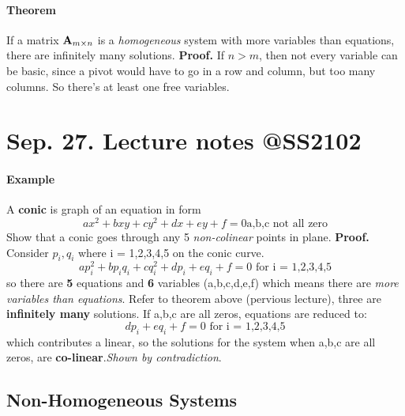 \documentclass{article}
\begin{document}
	\paragraph{Theorem} If a matrix $\text{\textbf{A}}_{m \times n}$ is a \emph{homogeneous} system with more variables than equations, there are infinitely many solutions.
	\newline
	\newline \textbf{Proof.}
	If $n > m$, then not every variable can be basic, since a pivot would have to go in a row and column, but too many columns. So there's at least one free variables.
	\section{Sep. 27. Lecture notes @SS2102}
	\paragraph{Example} A \textbf{conic} is graph of an equation in form
	\[
	ax^2 + b x y + c y^2 + d x + e y + f = 0 \text{a,b,c not all zero}
	\]
	Show that a conic goes through any 5 \emph{non-colinear} points in plane.
	\newline \textbf{Proof.}
	\newline 
	Consider $p_i,q_i$ where i = 1,2,3,4,5 on the conic curve.
	\[
	ap_i^2+bp_iq_i+cq_i^2+dp_i + eq_i + f = 0 \text{ for i = 1,2,3,4,5}
	\]
	so there are \textbf{5} equations and \textbf{6} variables (a,b,c,d,e,f) which means there are \emph{more variables than equations}. Refer to theorem above (pervious lecture), three are \textbf{infinitely many} solutions.
	\newline
	If a,b,c are all zeros, equations are reduced to:
	\[
	dp_i + eq_i + f = 0 \text{ for i = 1,2,3,4,5}
	\]
	which contributes a linear, so the solutions for the system when a,b,c are all zeros, are \textbf{co-linear}.\emph{Shown by contradiction}.
	\subsection{Non-Homogeneous Systems}
\end{document}
